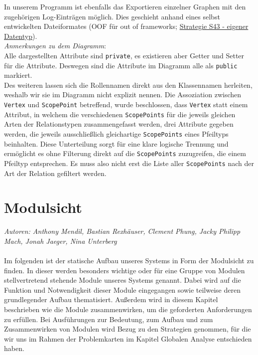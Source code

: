 \documentclass[enabledeprecatedfontcommands,fontsize=11pt,paper=a4,twoside]{scrartcl}
\begin{document}
In unserem Programm ist ebenfalls das Exportieren einzelner Graphen mit den zugehörigen Log-Einträgen möglich. Dies geschieht anhand eines selbst entwickelten Dateiformates (OOF für \glqq out of frameworks\grqq; \hyperlink{ooo}{Strategie S43 - eigener Datentyp}). \\

\textit{Anmerkungen zu dem Diagramm}: \\
Alle dargestellten Attribute sind \texttt{private}, es existieren aber Getter und Setter für die Attribute. Deswegen sind die Attribute im Diagramm alle als \texttt{public} markiert. \\
Des weiteren lassen sich die Rollennamen direkt aus den Klassennamen herleiten, weshalb wir sie im Diagramm nicht explizit nennen. Die Assoziation zwischen \texttt{Vertex} und \texttt{ScopePoint} betreffend, wurde beschlossen, dass \texttt{Vertex} statt einem Attribut, in welchem die verschiedenen \texttt{ScopePoints} für die jeweils gleichen Arten der Relationstypen zusammengefasst werden, drei Attribute gegeben werden, die jeweils ausschließlich gleichartige \texttt{ScopePoints} eines Pfeiltyps beinhalten. Diese Unterteilung sorgt für eine klare logische Trennung und ermöglicht es ohne Filterung direkt auf die \texttt{ScopePoints} zuzugreifen, die einem Pfeiltyp entsprechen. Es muss also nicht erst die Liste aller \texttt{ScopePoints} nach der Art der Relation gefiltert werden.\\




\newpage
\section{Modulsicht}
\emph{Autoren: Anthony Mendil, Bastian Rexhäuser, Clement Phung, Jacky Philipp Mach, Jonah Jaeger, Nina Unterberg}\\\\

Im folgenden ist der statische Aufbau unseres Systems in Form der Modulsicht zu finden. In dieser werden besonders wichtige oder für eine Gruppe von Modulen stellvertretend stehende Module unseres Systems genannt. Dabei wird auf die Funktion und Notwendigkeit dieser Module eingegangen sowie teilweise deren grundlegender Aufbau thematisiert. Außerdem wird in diesem Kapitel beschrieben wie die Module zusammenwirken, um die geforderten Anforderungen zu erfüllen. Bei Ausführungen zur Bedeutung, zum Aufbau und zum Zusammenwirken von Modulen wird Bezug zu den Strategien genommen, für die wir uns im Rahmen der Problemkarten im Kapitel \glqq Globalen Analyse\grqq{} entschieden haben. \\ \\
\end{document}
